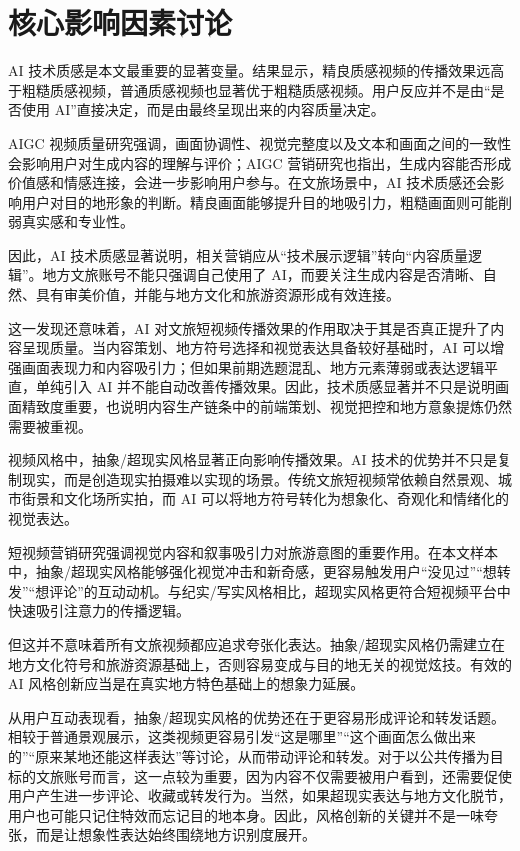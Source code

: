 \section{核心影响因素讨论}

AI 技术质感是本文最重要的显著变量。结果显示，精良质感视频的传播效果远高于粗糙质感视频，普通质感视频也显著优于粗糙质感视频。用户反应并不是由“是否使用 AI”直接决定，而是由最终呈现出来的内容质量决定。

AIGC 视频质量研究强调，画面协调性、视觉完整度以及文本和画面之间的一致性会影响用户对生成内容的理解与评价\cite{lit03}；AIGC 营销研究也指出，生成内容能否形成价值感和情感连接，会进一步影响用户参与\cite{lit18}。在文旅场景中，AI 技术质感还会影响用户对目的地形象的判断。精良画面能够提升目的地吸引力，粗糙画面则可能削弱真实感和专业性。

因此，AI 技术质感显著说明，相关营销应从“技术展示逻辑”转向“内容质量逻辑”。地方文旅账号不能只强调自己使用了 AI，而要关注生成内容是否清晰、自然、具有审美价值，并能与地方文化和旅游资源形成有效连接。

这一发现还意味着，AI 对文旅短视频传播效果的作用取决于其是否真正提升了内容呈现质量。当内容策划、地方符号选择和视觉表达具备较好基础时，AI 可以增强画面表现力和内容吸引力；但如果前期选题混乱、地方元素薄弱或表达逻辑平直，单纯引入 AI 并不能自动改善传播效果。因此，技术质感显著并不只是说明画面精致度重要，也说明内容生产链条中的前端策划、视觉把控和地方意象提炼仍然需要被重视。

视频风格中，抽象/超现实风格显著正向影响传播效果。AI 技术的优势并不只是复制现实，而是创造现实拍摄难以实现的场景。传统文旅短视频常依赖自然景观、城市街景和文化场所实拍，而 AI 可以将地方符号转化为想象化、奇观化和情绪化的视觉表达。

短视频营销研究强调视觉内容和叙事吸引力对旅游意图的重要作用\cite{lit06}。在本文样本中，抽象/超现实风格能够强化视觉冲击和新奇感，更容易触发用户“没见过”“想转发”“想评论”的互动动机。与纪实/写实风格相比，超现实风格更符合短视频平台中快速吸引注意力的传播逻辑。

但这并不意味着所有文旅视频都应追求夸张化表达。抽象/超现实风格仍需建立在地方文化符号和旅游资源基础上，否则容易变成与目的地无关的视觉炫技。有效的 AI 风格创新应当是在真实地方特色基础上的想象力延展。

从用户互动表现看，抽象/超现实风格的优势还在于更容易形成评论和转发话题。相较于普通景观展示，这类视频更容易引发“这是哪里”“这个画面怎么做出来的”“原来某地还能这样表达”等讨论，从而带动评论和转发。对于以公共传播为目标的文旅账号而言，这一点较为重要，因为内容不仅需要被用户看到，还需要促使用户产生进一步评论、收藏或转发行为。当然，如果超现实表达与地方文化脱节，用户也可能只记住特效而忘记目的地本身。因此，风格创新的关键并不是一味夸张，而是让想象性表达始终围绕地方识别度展开。

